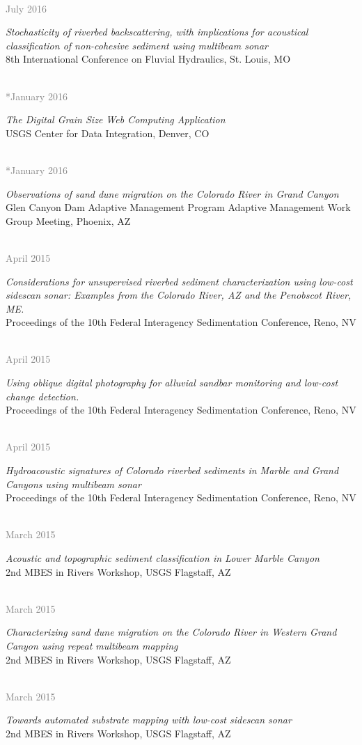 \documentclass{article} %
\newlength\sidebarwidth
\newcommand{\dateonly}[2][]
	 {\begin{minipage}{\textwidth}
	 \vspace*{.4\baselineskip}
         \nopagebreak\hspace{0in}%
         \nopagebreak\begin{minipage}[t]{\sidebarwidth - .2cm}
         \raggedleft {~}
         {\\[-\baselineskip] \textcolor{gray}{\footnotesize #1}}
	 \end{minipage}%
	 \hfill
	 \begin{minipage}[t]{\linewidth - \sidebarwidth}
	 #2%
	 \end{minipage}%
	 \vspace*{.2\baselineskip plus 1\baselineskip minus
	 .2\baselineskip}%
	 \end{minipage}}
\begin{document}
  \dateonly[July 2016]{
      {\it Stochasticity of riverbed backscattering, with implications for acoustical classification of non-cohesive sediment using multibeam sonar}\\
    8th International Conference on Fluvial Hydraulics, St. Louis, MO
  }

  \dateonly[**January 2016]{
      {\it The Digital Grain Size Web Computing Application}\\
      USGS Center for Data Integration, Denver, CO
  }

  \dateonly[**January 2016]{
      {\it Observations of sand dune migration on the Colorado River in Grand Canyon}\\
      Glen Canyon Dam Adaptive Management Program Adaptive Management Work Group Meeting, Phoenix, AZ
  }

  \dateonly[April 2015]{
      {\it Considerations for unsupervised riverbed sediment characterization using low-cost sidescan sonar: Examples from the Colorado River, AZ and the Penobscot River, ME.}\\
      Proceedings of the 10th Federal Interagency Sedimentation Conference, Reno, NV
  }

  \dateonly[April 2015]{
      {\it Using oblique digital photography for alluvial sandbar monitoring and low-cost change detection.}\\
      Proceedings of the 10th Federal Interagency Sedimentation Conference, Reno, NV
  }

  \dateonly[April 2015]{
      {\it Hydroacoustic signatures of Colorado riverbed sediments in Marble and Grand Canyons using multibeam sonar}\\
      Proceedings of the 10th Federal Interagency Sedimentation Conference, Reno, NV
  }

  \dateonly[March 2015]{
      {\it Acoustic and topographic sediment classification in Lower Marble Canyon}\\
      2nd MBES in Rivers Workshop, USGS Flagstaff, AZ
  }

  \dateonly[March 2015]{
      {\it Characterizing sand dune migration on the Colorado River in Western Grand Canyon using repeat multibeam mapping}\\
      2nd MBES in Rivers Workshop, USGS Flagstaff, AZ
  }

  \dateonly[March 2015]{
      {\it Towards automated substrate mapping with low-cost sidescan sonar}\\
      2nd MBES in Rivers Workshop, USGS Flagstaff, AZ
  }
\end{document}
